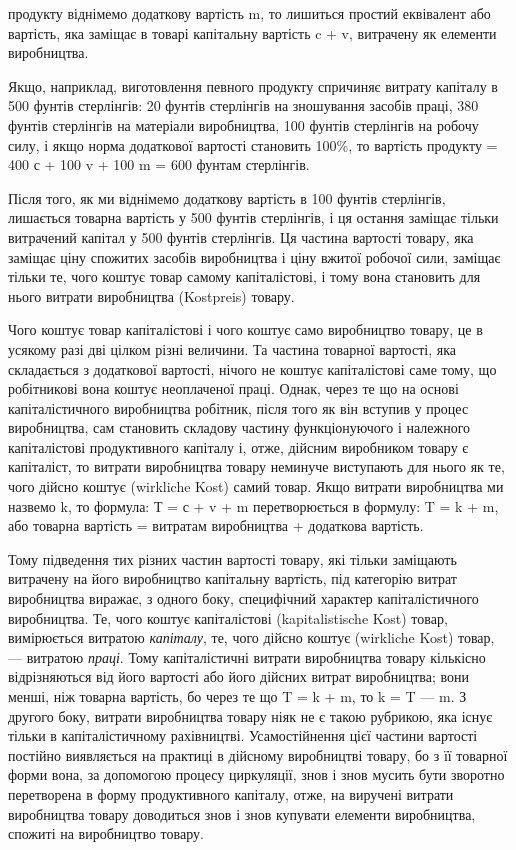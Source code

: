 \parcont{}  %
продукту віднімемо додаткову вартість m, то лишиться простий
еквівалент або вартість, яка заміщає в товарі капітальну вартість
c + v, витрачену як елементи виробництва.

Якщо, наприклад, виготовлення певного продукту спричиняє
витрату капіталу в 500 фунтів стерлінгів: 20 фунтів стерлінгів на
зношування засобів праці, 380 фунтів стерлінгів на матеріали
виробництва, 100 фунтів стерлінгів на робочу силу, і якщо норма
додаткової вартості становить 100\%, то вартість продукту =
400 с + 100 v + 100 m = 600 фунтам стерлінгів.

Після того, як ми віднімемо додаткову вартість в 100 фунтів
стерлінгів, лишається товарна вартість у 500 фунтів стерлінгів,
і ця остання заміщає тільки витрачений капітал у 500 фунтів
стерлінгів. Ця частина вартості товару, яка заміщає ціну спожитих
засобів виробництва і ціну вжитої робочої сили, заміщає
тільки те, чого коштує товар самому капіталістові, і тому вона
становить для нього витрати виробництва (Kostpreis) товару.

Чого коштує товар капіталістові і чого коштує само виробництво
товару, це в усякому разі дві цілком різні величини. Та
частина товарної вартості, яка складається з додаткової вартості,
нічого не коштує капіталістові саме тому, що робітникові
вона коштує неоплаченої праці. Однак, через те що на основі
капіталістичного виробництва робітник, після того як він вступив
у процес виробництва, сам становить складову частину
функціонуючого і належного капіталістові продуктивного капіталу
і, отже, дійсним виробником товару є капіталіст, то витрати
виробництва товару неминуче виступають для нього як
те, чого дійсно коштує (wirkliche Kost) самий товар. Якщо витрати
виробництва ми назвемо k, то формула: Т = с + v + m
перетворюється в формулу: T = k + m, або товарна вартість =
витратам виробництва + додаткова вартість.

Тому підведення тих різних частин вартості товару, які тільки
заміщають витрачену на його виробництво капітальну вартість,
під категорію витрат виробництва виражає, з одного боку, специфічний
характер капіталістичного виробництва. Те, чого коштує
капіталістові (kapitalistische Kost) товар, вимірюється витратою
\emph{капіталу}, те, чого дійсно коштує (wirkliche Kost) товар, —
витратою \emph{праці}. Тому капіталістичні витрати виробництва товару
кількісно відрізняються від його вартості або його дійсних
витрат виробництва; вони менші, ніж товарна вартість, бо через
те що T = k + m, то k = T — m. З другого боку, витрати
виробництва товару ніяк не є такою рубрикою, яка існує тільки
в капіталістичному рахівництві. Усамостійнення цієї частини вартості
постійно виявляється на практиці в дійсному виробництві
товару, бо з її товарної форми вона, за допомогою процесу
циркуляції, знов і знов мусить бути зворотно перетворена
в форму продуктивного капіталу, отже, на виручені витрати виробництва
товару доводиться знов і знов купувати елементи
виробництва, спожиті на виробництво товару.
